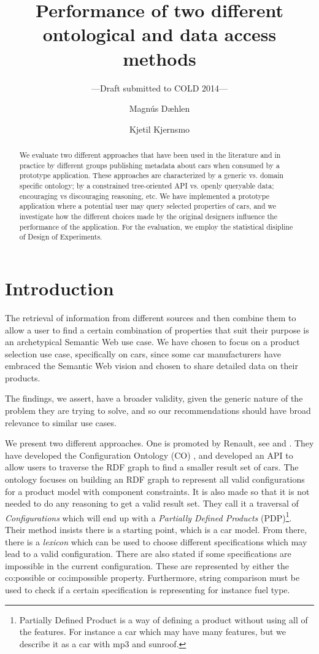 \documentclass{llncs}
\title{Performance of two different ontological and data access methods}
\author{Magn\'{u}s D\ae hlen \and Kjetil Kjernsmo}
\institute{Department of Informatics,
Postboks 1080 Blindern,
N-0316 Oslo, Norway \email{\{magnudae,kjekje\}@ifi.uio.no} }
\subtitle{---Draft submitted to COLD 2014---}
\begin{document}
\maketitle

\begin{abstract}
  We evaluate two different approaches that have been used in the
  literature and in practice by different groups publishing metadata
  about cars when consumed by a prototype application. These
  approaches are characterized by a generic vs. domain specific
  ontology; by a constrained tree-oriented API vs. openly queryable
  data; encouraging vs discouraging reasoning, etc.  We have
  implemented a prototype application where a potential user may query
  selected properties of cars, and we investigate how the different
  choices made by the original designers influence the performance of
  the application. For the evaluation, we employ the statistical
  disipline of Design of Experiments.

\end{abstract}

\section{Introduction}

The retrieval of information from different sources and then combine
them to allow a user to find a certain combination of properties that
suit their purpose is an archetypical Semantic Web use case. We have
chosen to focus on a product selection use case, specifically on cars,
since some car manufacturers have embraced the Semantic Web vision and chosen
to share detailed data on their products.

The findings, we assert, have a broader validity, given the generic
nature of the problem they are trying to solve, and so our
recommendations should have broad relevance to similar use cases.

We present two different approaches. One is promoted by Renault, see
\cite{SemWebAppRes} and \cite{ren1}. They have developed the
Configuration Ontology (CO) \cite{confOnt}, and developed an API to allow
users to traverse the RDF graph to find a smaller result set of cars.
The ontology focuses on building an RDF graph to represent all valid
configurations for a product model with component constraints.  It is
also made so that it is not needed to do any reasoning to get a valid
result set.  They call it a traversal of \emph{Configurations} which
will end up with a \emph{Partially Defined Products}
(PDP)\footnote{Partially Defined Product is a way of defining a
  product without using all of the features. For instance a car which
  may have many features, but we describe it as a car with mp3 and
  sunroof.}.  Their method insists there is a starting point, which is
a car model. From there, there is a \emph{lexicon} which can be used
to choose different specifications which may lead to a valid
configuration. There are also stated if some specifications are
impossible in the current configuration.  These are represented by
either the \textsf{co:possible} or \textsf{co:impossible}
property. Furthermore, string comparison must be used to check if a
certain specification is representing for instance fuel type.
\end{document}
